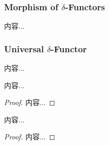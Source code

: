 \documentclass[Total.tex]{subfiles}
\begin{document}
					\subsubsection{Morphism of $\delta$-Functors}
					\begin{Def}
						内容...
					\end{Def}
					\subsubsection{Universal $\delta$-Functor}
					\begin{Def}
						内容...
					\end{Def}
					
					\begin{lemma}
						内容...
					\end{lemma}
					\begin{proof}
						内容...
					\end{proof}
					
					\begin{lemma}
						内容...
					\end{lemma}
					\begin{proof}
						内容...
					\end{proof}
\end{document}
